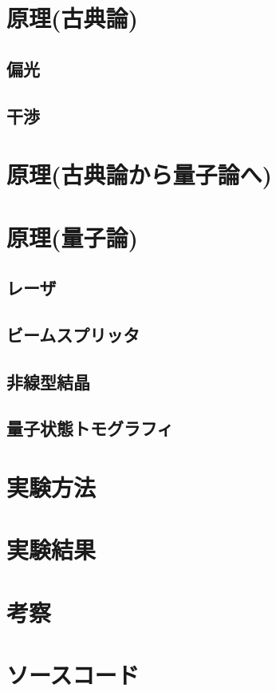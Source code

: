 \documentclass{report}
\begin{document}
  \maketitle
  \tableofcontents
  \chapter{原理(古典論)}
    \section{偏光}
      
    \section{干渉}
      
  \chapter{原理(古典論から量子論へ)}
    
  \chapter{原理(量子論)}
    \section{レーザ}
      
    \section{ビームスプリッタ}
      
    \section{非線型結晶}
      
    \section{量子状態トモグラフィ}
      
  \chapter{実験方法}
  \chapter{実験結果}
  \chapter{考察}
  \appendix
  \chapter{ソースコード}
  \inputminted[linenos, frame=lines, label=qst-code]{python}{../experiment/qst/main.py}
\end{document}
